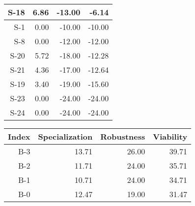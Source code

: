 \begin{tabular}{ | r | r | r | r | }
    \hline
                  S-18  &            6.86  &          -13.00  &           -6.14  \\
    \hline
                   S-1  &            0.00  &          -10.00  &          -10.00  \\
    \hline
                   S-8  &            0.00  &          -12.00  &          -12.00  \\
    \hline
                  S-20  &            5.72  &          -18.00  &          -12.28  \\
    \hline
                  S-21  &            4.36  &          -17.00  &          -12.64  \\
    \hline
                  S-19  &            3.40  &          -19.00  &          -15.60  \\
    \hline
                  S-23  &            0.00  &          -24.00  &          -24.00  \\
    \hline
                  S-24  &            0.00  &          -24.00  &          -24.00  \\
    \hline
\end{tabular}


\begin{tabular}{ | r | r | r | r | }
    \hline
                 Index  &  Specialization  &      Robustness  &       Viability  \\
    \hline
    \hline
                   B-3  &           13.71  &           26.00  &           39.71  \\
    \hline
                   B-2  &           11.71  &           24.00  &           35.71  \\
    \hline
                   B-1  &           10.71  &           24.00  &           34.71  \\
    \hline
                   B-0  &           12.47  &           19.00  &           31.47  \\
    \hline
\end{tabular}


